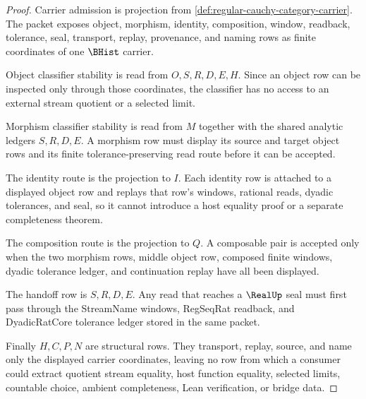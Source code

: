 \begin{proof}
Carrier admission is projection from \autoref{def:regular-cauchy-category-carrier}. The packet exposes object, morphism, identity, composition, window, readback, tolerance, seal, transport, replay, provenance, and naming rows as finite coordinates of one $\BHist$ carrier.

Object classifier stability is read from $O,S,R,D,E,H$. Since an object row can be inspected only through those coordinates, the classifier has no access to an external stream quotient or a selected limit.

Morphism classifier stability is read from $M$ together with the shared analytic ledgers $S,R,D,E$. A morphism row must display its source and target object rows and its finite tolerance-preserving read route before it can be accepted.

The identity route is the projection to $I$. Each identity row is attached to a displayed object row and replays that row's windows, rational reads, dyadic tolerances, and seal, so it cannot introduce a host equality proof or a separate completeness theorem.

The composition route is the projection to $Q$. A composable pair is accepted only when the two morphism rows, middle object row, composed finite windows, dyadic tolerance ledger, and continuation replay have all been displayed.

The handoff row is $S,R,D,E$. Any read that reaches a $\RealUp$ seal must first pass through the StreamName windows, RegSeqRat readback, and DyadicRatCore tolerance ledger stored in the same packet.

Finally $H,C,P,N$ are structural rows. They transport, replay, source, and name only the displayed carrier coordinates, leaving no row from which a consumer could extract quotient stream equality, host function equality, selected limits, countable choice, ambient completeness, Lean verification, or bridge data.
\end{proof}

